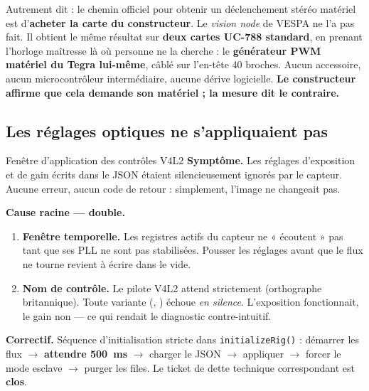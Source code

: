 \documentclass[11pt,a4paper]{article}
\begin{document}
\medskip
\noindent
Autrement dit : le chemin officiel pour obtenir un déclenchement stéréo matériel est
d'\textbf{acheter la carte du constructeur}. Le \emph{vision node} de VESPA ne l'a pas fait.
Il obtient le même résultat sur \textbf{deux cartes UC-788 standard}, en prenant l'horloge
maîtresse là où personne ne la cherche : le \textbf{générateur PWM matériel du Tegra
lui-même}, câblé sur l'en-tête 40 broches. Aucun accessoire, aucun microcontrôleur
intermédiaire, aucune dérive logicielle. \textbf{Le constructeur affirme que cela demande son
matériel ; la mesure dit le contraire.}

\subsection{Les réglages optiques ne s'appliquaient pas}

\begin{verroulevé}{Fenêtre d'application des contrôles V4L2}
\textbf{Symptôme.} Les réglages d'exposition et de gain écrits dans le JSON étaient
silencieusement ignorés par le capteur. Aucune erreur, aucun code de retour :
simplement, l'image ne changeait pas.

\textbf{Cause racine — double.}
\begin{enumerate}[nosep]
  \item \textbf{Fenêtre temporelle.} Les registres actifs du capteur ne « écoutent » pas
        tant que ses PLL ne sont pas stabilisées. Pousser les réglages avant que le flux
        ne tourne revient à écrire dans le vide.
  \item \textbf{Nom de contrôle.} Le pilote V4L2 attend strictement
         (orthographe britannique). Toute variante
        (, ) échoue \emph{en silence}. L'exposition
        fonctionnait, le gain non — ce qui rendait le diagnostic contre-intuitif.
\end{enumerate}

\textbf{Correctif.} Séquence d'initialisation stricte dans \texttt{initializeRig()} :
démarrer les flux $\rightarrow$ \textbf{attendre 500~ms} $\rightarrow$ charger le JSON
$\rightarrow$ appliquer $\rightarrow$ forcer le mode esclave $\rightarrow$ purger les files.
Le ticket de dette technique correspondant est \textbf{clos}.
\end{verroulevé}

\end{document}
